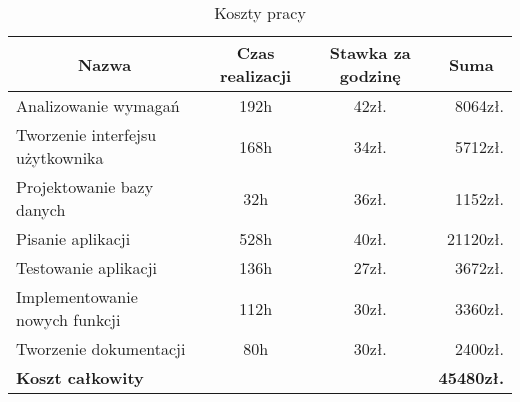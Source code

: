 \begin{table}[ht]
\begin{center}
\begin{tabular}{| l | c | c | r |}
	\hline
	  \multicolumn{1}{|c|}{Nazwa} & \multicolumn{1}{|c|}{Czas realizacji} & \multicolumn{1}{|c|}{Stawka za godzinę} & \multicolumn{1}{|c|}{Suma} \\
	\hline
		Analizowanie wymagań & 192h & 42zł. & 8064zł. \\
	\hline
		Tworzenie interfejsu użytkownika & 168h  & 34zł. & 5712zł. \\
	\hline
		Projektowanie bazy danych & 32h & 36zł. & 1152zł. \\
	\hline
		Pisanie aplikacji & 528h  & 40zł. & 21120zł. \\
	\hline
		Testowanie aplikacji & 136h & 27zł. & 3672zł. \\
	\hline
		Implementowanie nowych funkcji & 112h & 30zł. & 3360zł. \\
	\hline
		Tworzenie dokumentacji & 80h & 30zł. & 2400zł. \\
	\hline
		\multicolumn{3}{|l}{\textbf{Koszt całkowity}} & \textbf{45480zł.} \\
	\hline
\end{tabular}
\end{center}
\caption{Koszty pracy}
\end{table}

